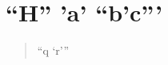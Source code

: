 \documentclass[11pt]{article}
\author{Au}
\date{2026-01-01}
\title{}
\begin{document}
\tableofcontents

\section{``H'' 'a' ``b'c'''}
\label{sec:org007b5a7}
\begin{quote}
``q `r'''
\end{quote}
\end{document}
